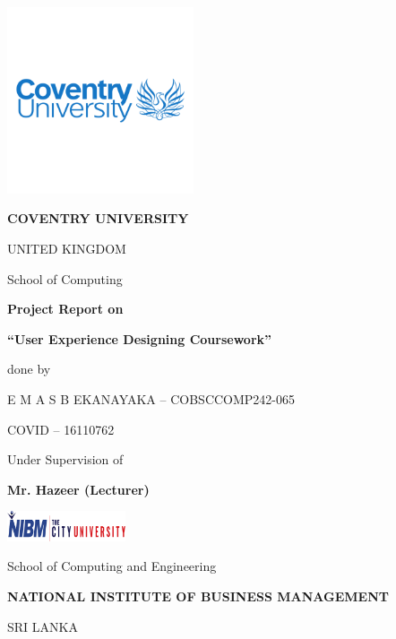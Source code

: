 \documentclass[12pt,a4paper]{article}
\begin{document}
\begin{titlepage}
    \centering
    \vspace*{0.3cm}
    
    \includegraphics[width=5.5cm]{coventry-logo.png} %
    
    \vspace{1cm}
    
    {\Huge\bfseries COVENTRY UNIVERSITY}
    
    {\Large UNITED KINGDOM}
    
    \vspace{1cm}
    
    {\Large School of Computing}
    
    \vspace{1.2cm}
    
    {\huge\bfseries Project Report on}
    
    \vspace{0.3cm}
    
    {\Huge\bfseries ``User Experience Designing Coursework''}
    
    \vspace{1.2cm}
    
    {\Large done by}
    
    \vspace{0.3cm}
    
    {\Large E M A S B EKANAYAKA – COBSCCOMP242-065}
    
    {\Large COVID – 16110762}
    
    \vspace{0.8cm}
    
    {\Large Under Supervision of}
    
    \vspace{0.3cm}
    
    {\Large\bfseries Mr. Hazeer (Lecturer)}
    
    \vfill %
    
    \includegraphics[width=3.5cm]{nibm-logo.png} %
    
    \vspace{0.3cm}
    
    {\Large School of Computing and Engineering}
    
    {\Large\bfseries NATIONAL INSTITUTE OF BUSINESS MANAGEMENT}
    
    {\Large SRI LANKA}
    
\end{titlepage}
\end{document}
